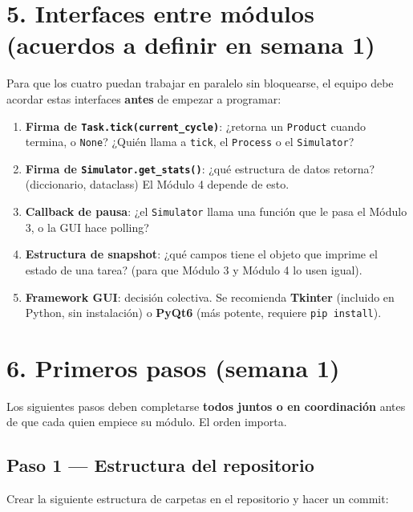 \documentclass[12pt,letterpaper]{article}
\begin{document}
\section*{5. Interfaces entre módulos (acuerdos a definir en semana 1)}

Para que los cuatro puedan trabajar en paralelo sin bloquearse, el equipo debe acordar estas interfaces \textbf{antes} de empezar a programar:

\begin{enumerate}[leftmargin=2em]
    \item \textbf{Firma de \texttt{Task.tick(current\_cycle)}}: ¿retorna un \texttt{Product} cuando termina, o \texttt{None}? ¿Quién llama a \texttt{tick}, el \texttt{Process} o el \texttt{Simulator}?
    \item \textbf{Firma de \texttt{Simulator.get\_stats()}}: ¿qué estructura de datos retorna? (diccionario, dataclass) El Módulo 4 depende de esto.
    \item \textbf{Callback de pausa}: ¿el \texttt{Simulator} llama una función que le pasa el Módulo 3, o la GUI hace polling?
    \item \textbf{Estructura de snapshot}: ¿qué campos tiene el objeto que imprime el estado de una tarea? (para que Módulo 3 y Módulo 4 lo usen igual).
    \item \textbf{Framework GUI}: decisión colectiva. Se recomienda \textbf{Tkinter} (incluido en Python, sin instalación) o \textbf{PyQt6} (más potente, requiere \texttt{pip install}).
\end{enumerate}

\newpage
\section*{6. Primeros pasos (semana 1)}

Los siguientes pasos deben completarse \textbf{todos juntos o en coordinación} antes de que cada quien empiece su módulo. El orden importa.

\subsection*{Paso 1 --- Estructura del repositorio}

Crear la siguiente estructura de carpetas en el repositorio y hacer un commit:
\end{document}
